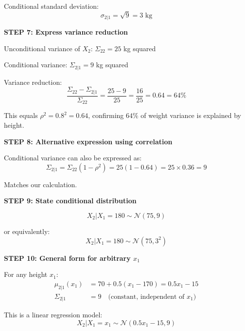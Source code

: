 \documentclass[12pt]{article}
\begin{document}
\begin{solution}
Conditional standard deviation:
\[
\sigma_{2|1} = \sqrt{9} = 3 \text{ kg}
\]

\textbf{STEP 7: Express variance reduction}

Unconditional variance of $X_2$: $\Sigma_{22} = 25$ kg squared

Conditional variance: $\Sigma_{2|1} = 9$ kg squared

Variance reduction:
\[
\frac{\Sigma_{22} - \Sigma_{2|1}}{\Sigma_{22}} = \frac{25 - 9}{25} = \frac{16}{25} = 0.64 = 64\%
\]

This equals $\rho^2 = 0.8^2 = 0.64$, confirming $64\%$ of weight variance is explained by height.

\textbf{STEP 8: Alternative expression using correlation}

Conditional variance can also be expressed as:
\[
\Sigma_{2|1} = \Sigma_{22}(1 - \rho^2) = 25(1 - 0.64) = 25 \times 0.36 = 9
\]

Matches our calculation.

\textbf{STEP 9: State conditional distribution}

\[
\boxed{X_2 | X_1 = 180 \sim \mathcal{N}(75, 9)}
\]

or equivalently:
\[
\boxed{X_2 | X_1 = 180 \sim \mathcal{N}(75, 3^2)}
\]

\textbf{STEP 10: General form for arbitrary $x_1$}

For any height $x_1$:
\begin{align*}
\mu_{2|1}(x_1) &= 70 + 0.5(x_1 - 170) = 0.5x_1 - 15 \\
\Sigma_{2|1} &= 9 \quad \text{(constant, independent of } x_1\text{)}
\end{align*}

This is a linear regression model:
\[
X_2 | X_1 = x_1 \sim \mathcal{N}(0.5x_1 - 15, 9)
\]

\end{solution}
\end{document}

